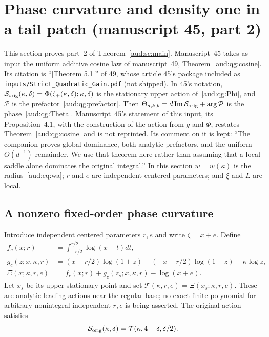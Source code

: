 \documentclass[11pt,a4paper]{article}
\numberwithin{equation}{section}
\begin{document}
\section{Phase curvature and density one in a tail patch (manuscript 45, part 2)}\label{aud:sec:45b}
This section proves part~2 of Theorem~\ref{aud:sc:main}. Manuscript~45 takes as input the uniform additive cosine law of manuscript~49, Theorem~\ref{aud:qg:cosine}. Its citation is ``[Theorem 5.1]'' of 49, whose article 45's package included as \nolinkurl{inputs/Strict_Quadratic_Gain.pdf} (not shipped). In 45's notation, $\mathcal S_{\rm orig}(\kappa,\delta)=\Phi(\zeta_+(\kappa,\delta);\kappa,\delta)$ is the stationary upper action of~\eqref{aud:qg:Phi}, and $\mathcal P$ is the prefactor~\eqref{aud:qg:prefactor}. Then $\Theta_{d,k,b}=d\operatorname{Im}\mathcal S_{\rm orig}+\arg\mathcal P$ is the phase~\eqref{aud:qg:Theta}. Manuscript~45's statement of this input, its Proposition~4.1, with the construction of the action from $g$ and $\Phi$, restates Theorem~\ref{aud:qg:cosine} and is not reprinted. Its comment on it is kept: ``The companion proves global dominance, both analytic prefactors, and the uniform $O(d^{-1})$ remainder. We use that theorem here rather than assuming that a local saddle alone dominates the original integral.'' In this section $w=w(\kappa)$ is the radius~\eqref{aud:eq:wa}; $r$ and $e$ are independent centered parameters; and $\xi$ and $L$ are local.

\subsection{A nonzero fixed-order phase curvature}
Introduce independent centered parameters $r,e$ and write $\zeta=x+e$. Define
\begin{align*}
 f_c(x;r)&=\int_{-r/2}^{r/2}\log(x-t)dt,\\
 g_c(z;x,\kappa,r)&=(x-r/2)\log(1+z)+(-x-r/2)\log(1-z)-\kappa\log z,\\
 \Xi(x;\kappa,r,e)&=f_c(x;r)+g_c(z_s;x,\kappa,r)-\log(x+e).
\end{align*}
Let $x_s$ be its upper stationary point and set $\mathcal T(\kappa,r,e)=\Xi(x_s;\kappa,r,e)$. These are analytic leading actions near the regular base; no exact finite polynomial for arbitrary nonintegral independent $r,e$ is being asserted. The original action satisfies
\begin{equation}\label{aud:sc:centeredaction}
 \mathcal S_{\rm orig}(\kappa,\delta)
 =\mathcal T(\kappa,4+\delta,\delta/2).
\end{equation}
\end{document}
